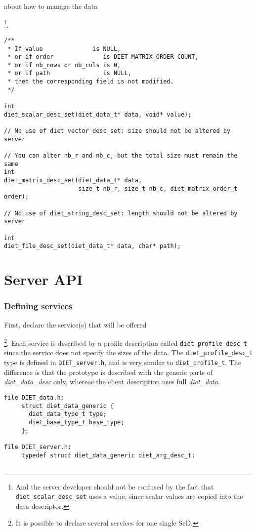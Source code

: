 about how to manage the data{\footnote{And the server developer
should not be confused by the fact that
\texttt{diet\_scalar\_desc\_set} uses a value, since scalar values
are copied into the data descriptor.}.

{\footnotesize
\begin{verbatim}
/**
 * If value              is NULL,
 * or if order              is DIET_MATRIX_ORDER_COUNT,
 * or if nb_rows or nb_cols is 0,
 * or if path               is NULL,
 * then the corresponding field is not modified.
 */

int
diet_scalar_desc_set(diet_data_t* data, void* value);

// No use of diet_vector_desc_set: size should not be altered by server

// You can alter nb_r and nb_c, but the total size must remain the same
int
diet_matrix_desc_set(diet_data_t* data,
                     size_t nb_r, size_t nb_c, diet_matrix_order_t order);

// No use of diet_string_desc_set: length should not be altered by server

int
diet_file_desc_set(diet_data_t* data, char* path);
\end{verbatim}
}


\section{Server API}
\label{sec:svAPI}


\subsubsection*{Defining services}

First, declare the service(s) that will be offered{\footnote{It is
possible to declare several services for one single SeD.}.
Each service is described by a profile description called
\texttt{diet\_profile\_desc\_t} since the service does not specify
the sizes of the data. The \texttt{diet\_profile\_desc\_t} type is
defined in \texttt{DIET\_server.h}, and is very similar to
\texttt{diet\_profile\_t}. The difference is that the prototype is
described with the generic parts of \emph{diet\_data\_desc} only,
whereas the client description uses full \emph{diet\_data}.
{\footnotesize
\begin{verbatim}
file DIET_data.h:
     struct diet_data_generic {
       diet_data_type_t type;
       diet_base_type_t base_type;
     };

file DIET_server.h:
     typedef struct diet_data_generic diet_arg_desc_t;


\end{verbatim}}}}
